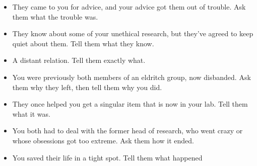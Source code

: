 {\begin{history}
\begin{itemize}
\item They came to you for advice, and your advice got them out of trouble. Ask them what the trouble was.
\item They know about some of your unethical research, but they’ve agreed to keep quiet about them. Tell them what they know.
\item A distant relation. Tell them exactly what.
\item You were previously both members of an eldritch group, now disbanded. Ask them why they left, then tell them why you did.
\item They once helped you get a singular item that is now in your lab. Tell them what it was.
\item You both had to deal with the former head of research, who went crazy or whose obsessions got too extreme. Ask them how it ended.
\item You saved their life in a tight spot. Tell them what happened
\end{itemize}
\end{history}%
%
}{%
%
\levelingup
%
%
%
}%
